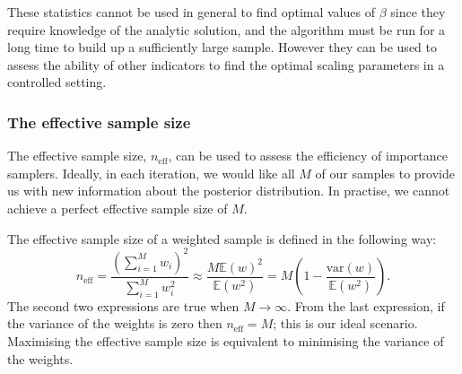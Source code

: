 \documentclass[final]{siamltex}
\newcommand{\neff}{n_{\text{eff}}}
\newcommand{\E}{{\mathbb E}}
\DeclareMathOperator*{\argmin}{arg\,min}
\begin{document}
These statistics cannot be used in general to find optimal values of
$\beta$ since they require knowledge of the analytic solution, and
the algorithm must be run for a long time to build up a
sufficiently large sample. However they can be used to assess the
ability of other indicators to find the optimal scaling parameters in
a controlled setting.



\subsubsection{The effective sample size}\label{sec:ess}

The effective sample size, $\neff$, can be used to assess the
efficiency of importance samplers. Ideally, in each iteration, we
would like all $M$ of our samples to provide us with new information
about the posterior distribution. In practise, we cannot achieve a
perfect effective sample size of $M$.

The effective sample size of a weighted sample is defined in the
following way:
\[
	\neff = \frac{\left(\sum_{i=1}^M \! w_i\right)^2}{\sum_{i=1}^M \! w_i^2} \approx \frac{M\E(w)^2}{\E(w^2)} = M\left(1 - \frac{\mbox{var}(w)}{\mathbb{E}(w^2)}\right).
\]
The second two expressions are true when $M\rightarrow\infty$. From
the last expression, if the variance of the weights is zero then
$\neff = M$; this is our ideal scenario. Maximising the effective
sample size is equivalent to minimising the variance of the weights.
\end{document}
